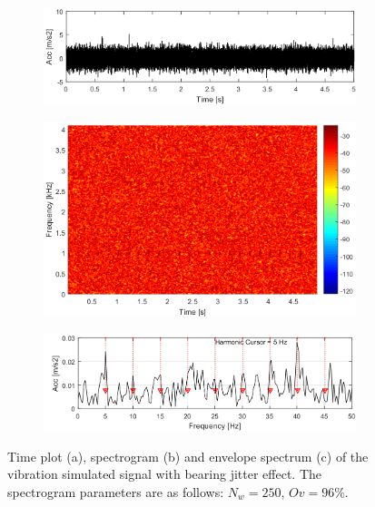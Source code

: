 \begin{figure}[!ht]
    \centering
    \begin{subfigure}[b]{0.8\textwidth}
        \centering
        \captionsetup{skip=0.01pt}
         \caption{}
        \includegraphics[width=\textwidth]{wykresy/chapter_application/semi_blind/sygnal_jitter.png}
        \label{fig:chapter7/semi_blind/time_jitter}
    \end{subfigure}
    \begin{subfigure}[b]{0.7\textwidth}
        \centering
        \captionsetup{skip=0.01pt}
         \caption{}
        \includegraphics[width=\textwidth]{wykresy/chapter_application/semi_blind/spectrogram_jitter.png}
        \label{fig:chapter7/semi_blind/spectrogram_jitter}
    \end{subfigure}
    \begin{subfigure}[b]{0.8\textwidth}
        \centering
        \captionsetup{skip=0.01pt}
        \caption{}
        \includegraphics[width=\textwidth]{wykresy/chapter_application/semi_blind/widmo_obwiedni_jitter.png}
        \label{fig:chapter7/semi_blind/obwiednia_jitter}
    \end{subfigure}
    \caption{Time plot (a), spectrogram (b) and envelope spectrum (c) of the vibration simulated signal with bearing jitter effect. The spectrogram parameters are as follows: $N_w=250$, $Ov=96\%$.}
\end{figure}
